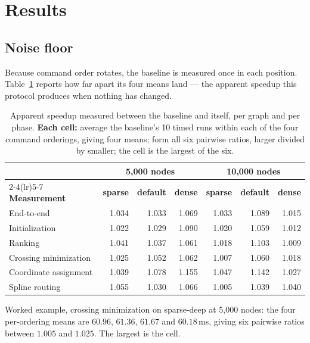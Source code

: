 \section{Results}
\label{sec:results}

\subsection{Noise floor}
\label{sec:floor}

Because command order rotates, the baseline is measured once in each position.
Table~\ref{tab:floor} reports how far apart its four means land --- the
apparent speedup this protocol produces when nothing has changed.

\begin{table}[htbp]
\centering
\caption{Apparent speedup measured between the baseline and itself, per graph
and per phase. \textbf{Each cell:} average the baseline's 10 timed runs within
each of the four command orderings, giving four means; form all six pairwise
ratios, larger divided by smaller; the cell is the largest of the six.}
\label{tab:floor}
\small
\begin{tabular}{lrrrrrr}
\toprule
& \multicolumn{3}{c}{\textbf{5{,}000 nodes}} & \multicolumn{3}{c}{\textbf{10{,}000 nodes}} \\
\cmidrule(lr){2-4}\cmidrule(lr){5-7}
\textbf{Measurement} & \textbf{sparse} & \textbf{default} & \textbf{dense} & \textbf{sparse} & \textbf{default} & \textbf{dense} \\
\midrule
End-to-end            & 1.034 & 1.033 & 1.069 & 1.033 & 1.089 & 1.015 \\
\midrule
Initialization        & 1.022 & 1.029 & 1.090 & 1.020 & 1.059 & 1.012 \\
Ranking               & 1.041 & 1.037 & 1.061 & 1.018 & 1.103 & 1.009 \\
Crossing minimization & 1.025 & 1.052 & 1.062 & 1.007 & 1.060 & 1.018 \\
Coordinate assignment & 1.039 & 1.078 & 1.155 & 1.047 & 1.142 & 1.027 \\
Spline routing        & 1.055 & 1.030 & 1.066 & 1.005 & 1.039 & 1.040 \\
\bottomrule
\end{tabular}
\end{table}

Worked example, crossing minimization on sparse-deep at 5{,}000 nodes: the four
per-ordering means are $60.96$, $61.36$, $61.67$ and $60.18$\,ms, giving six
pairwise ratios between $1.005$ and $1.025$. The largest is the cell.

